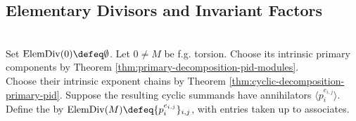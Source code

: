 \subsection{Elementary Divisors and Invariant Factors}

\begin{definition} \label{def:elementary-divisors-pid-module} \\
Set $\operatorname{ElemDiv}(0)\defeq\emptyset$. Let $0\neq M$ be f.g. torsion. Choose its intrinsic primary components by Theorem \ref{thm:primary-decomposition-pid-modules}.\\
Choose their intrinsic exponent chains by Theorem \ref{thm:cyclic-decomposition-primary-pid}. Suppose the resulting cyclic summands have annihilators $\langle p_i^{e_{i,j}}\rangle$.\\
Define the  by $\operatorname{ElemDiv}(M)\defeq\{p_i^{e_{i,j}}\}_{i,j}$, with entries taken up to associates.
\end{definition}

